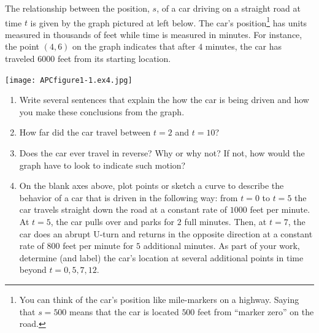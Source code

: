 \documentclass[handout]{ximera}
\begin{document}
\begin{problem}
The relationship between the position, $s$, of a car driving on a straight road at time $t$ is given by the graph pictured at left below. The car's position\footnote{You can think of the car's position like mile-markers on a highway.  Saying that $s = 500$ means that the car is located $500$ feet from ``marker zero'' on the road.\label{fn-1}} has units measured in thousands of feet while time is measured in minutes. For instance, the point $(4,6)$ on the graph indicates that after $4$ minutes, the car has traveled $6000$ feet from its starting location.%

\texttt{[image: APCfigure1-1.ex4.jpg]}

\begin{enumerate}[label=\alph*.]
\item Write several sentences that explain the how the car is being driven and how you make these conclusions from the graph.%
\item How far did the car travel between $t = 2$ and $t = 10$?%
\item Does the car ever travel in reverse?  Why or why not?  If not, how would the graph have to look to indicate such motion?%
\item On the blank axes above, plot points or sketch a curve to describe the behavior of a car that is driven in the following way:  from $t = 0$ to $t = 5$ the car travels straight down the road at a constant rate of $1000$ feet per minute.  At $t = 5$, the car pulls over and parks for $2$ full minutes.  Then, at $t = 7$, the car does an abrupt U-turn and returns in the opposite direction at a constant rate of $800$ feet per minute for $5$ additional minutes.  As part of your work, determine (and label) the car's location at several additional points in time beyond $t = 0, 5, 7, 12$.%

\end{enumerate}

\end{problem}
\end{document}
